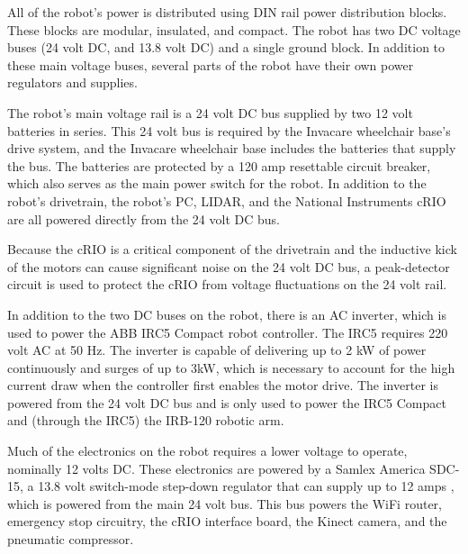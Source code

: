 \documentclass[]{cwru} %
\begin{document}
All of the robot's power is distributed using DIN rail power
distribution blocks. These blocks are modular, insulated, and compact.
The robot has two DC voltage buses (24 volt DC, and 13.8 volt DC) and a
single ground block. In addition to these main voltage buses, several
parts of the robot have their own power regulators and supplies.

The robot's main voltage rail is a 24 volt DC bus supplied by two 12
volt batteries in series. This 24 volt bus is required by the Invacare
wheelchair base's drive system, and the Invacare wheelchair base
includes the batteries that supply the bus. The batteries are protected
by a 120 amp resettable circuit breaker, which also serves as the main
power switch for the robot. In addition to the robot's drivetrain, the
robot's PC, LIDAR, and the National Instruments cRIO are all powered
directly from the 24 volt DC bus.

Because the cRIO is a critical component of the drivetrain and the
inductive kick of the motors can cause significant noise on the 24 volt
DC bus, a peak-detector circuit is used to protect the cRIO from voltage
fluctuations on the 24 volt rail.

In addition to the two DC buses on the robot, there is an AC inverter,
which is used to power the ABB IRC5 Compact robot controller. The IRC5
requires 220 volt AC at 50 Hz. The inverter is capable of delivering up
to 2 kW of power continuously and surges of up to 3kW, which is
necessary to account for the high current draw when the controller first
enables the motor drive. The inverter is powered from the 24 volt DC bus
and is only used to power the IRC5 Compact and (through the IRC5) the
IRB-120 robotic arm.

Much of the electronics on the robot requires a lower voltage to
operate, nominally 12 volts DC. These electronics are powered by a
Samlex America SDC-15, a 13.8 volt switch-mode step-down regulator that
can supply up to 12 amps \cite{samlex}, which is powered from the main 24 volt
bus. This bus powers the WiFi router, emergency stop circuitry, the cRIO
interface board, the Kinect camera, and the pneumatic compressor.
\end{document}

